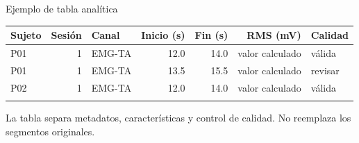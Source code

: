 \documentclass[
  ignorenonframetext,
  aspectratio=169,
  spanish,
  professionalfonts]{beamer}
\newcounter{none} %
\begin{document}
\begin{frame}{Ejemplo de tabla analítica}
\protect{}\label{ejemplo-de-tabla-analuxedtica}
{\def\LTcaptype{none} %
\begin{longtable}[]{@{}lrlrrrl@{}}
\toprule\noalign{}
Sujeto & Sesión & Canal & Inicio (s) & Fin (s) & RMS (mV) & Calidad \\
\midrule\noalign{}
\endhead
P01 & 1 & EMG-TA & 12.0 & 14.0 & valor calculado & válida \\
P01 & 1 & EMG-TA & 13.5 & 15.5 & valor calculado & revisar \\
P02 & 1 & EMG-TA & 12.0 & 14.0 & valor calculado & válida \\
\bottomrule\noalign{}
\end{longtable}
}

\begin{tcolorbox}[enhanced jigsaw, arc=.35mm, bottomrule=.15mm, bottomtitle=1mm, breakable, colback=white, colbacktitle=quarto-callout-note-color!10!white, colframe=quarto-callout-note-color-frame, coltitle=black, left=2mm, leftrule=.75mm, opacityback=0, opacitybacktitle=0.6, rightrule=.15mm, title={Diseño correcto}, titlerule=0mm, toprule=.15mm, toptitle=1mm]

La tabla separa metadatos, características y control de calidad. No
reemplaza los segmentos originales.

\end{tcolorbox}
\end{frame}
\end{document}
